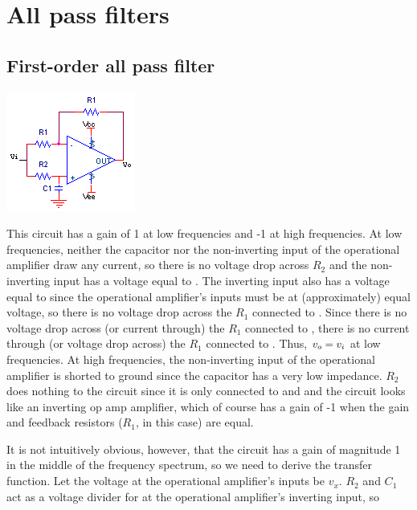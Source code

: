 \section{All pass filters}
\subsection{First-order all pass filter}
\begin{center}
	\includegraphics{schematics/1storderallpassfilter.PNG}
\end{center}
This circuit \autocite[328]{op-amps-for-everyone} has a gain of 1 at low frequencies and -1 at high frequencies.
At low frequencies, neither the capacitor nor the non-inverting input of the operational amplifier draw any current, so there is no voltage drop across $R_2$ and the non-inverting input has a voltage equal to \vin.
The inverting input also has a voltage equal to \vin since the operational amplifier's inputs must be at (approximately) equal voltage, so there is no voltage drop across the $R_1$ connected to \vin.
Since there is no voltage drop across (or current through) the $R_1$ connected to \vin, there is no current through (or voltage drop across) the $R_1$ connected to \vout. Thus, $\vout = \vin$ at low frequencies.
At high frequencies, the non-inverting input of the operational amplifier is shorted to ground since the capacitor has a very low impedance.
$R_2$ does nothing to the circuit since it is only connected to \vin and \gnd and the circuit looks like an inverting op amp amplifier, which of course has a gain of -1 when the gain and feedback resistors ($R_1$, in this case) are equal.

It is not intuitively obvious, however, that the circuit has a gain of magnitude 1 in the middle of the frequency spectrum, so we need to derive the transfer function.
Let the voltage at the operational amplifier's inputs be $v_x$.
$R_2$ and $C_1$ act as a voltage divider for \vin at the operational amplifier's inverting input, so

